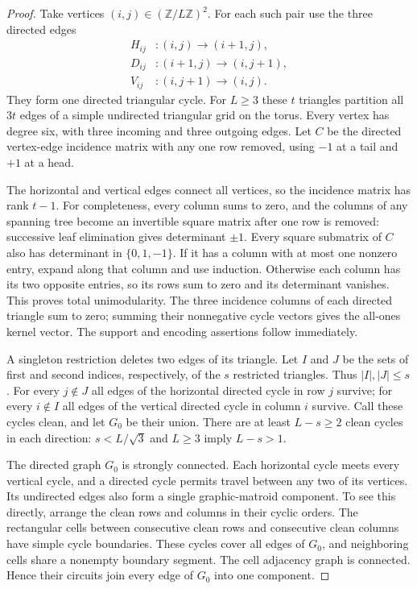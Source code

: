 \begin{proof}
Take vertices $(i,j)\in(\mathbb Z/L\mathbb Z)^2$.  For each such pair use the
three directed edges
\[
 \begin{split}
 H_{ij}&:(i,j)\longrightarrow(i+1,j),\\
 D_{ij}&:(i+1,j)\longrightarrow(i,j+1),\\
 V_{ij}&:(i,j+1)\longrightarrow(i,j).
 \end{split}
\]
They form one directed triangular cycle.  For $L\ge3$ these $t$ triangles
partition all $3t$ edges of a simple undirected triangular grid on the torus.
Every vertex has degree six, with three incoming and three outgoing edges.
Let $C$ be the directed vertex-edge incidence matrix with any one row removed,
using $-1$ at a tail and $+1$ at a head.

The horizontal and vertical edges connect all vertices, so the incidence
matrix has rank $t-1$.  For completeness, every column sums to zero, and
the columns of any spanning tree become an invertible square matrix after
one row is removed: successive leaf elimination gives determinant $\pm1$.
Every square submatrix of $C$ also has determinant in $\{0,1,-1\}$.
If it has a column with at most one nonzero entry, expand along that column
and use induction.  Otherwise each column has its two opposite entries,
so its rows sum to zero and its determinant vanishes.  This proves total
unimodularity.  The three incidence columns of each directed triangle sum
to zero; summing their nonnegative cycle vectors gives the all-ones kernel
vector.  The support and encoding assertions follow immediately.

A singleton restriction deletes two edges of its triangle.  Let $I$ and $J$
be the sets of first and second indices, respectively, of the $s$ restricted
triangles.  Thus $|I|,|J|\le s$.  For every $j\notin J$ all edges of the
horizontal directed cycle in row $j$ survive; for every $i\notin I$ all edges
of the vertical directed cycle in column $i$ survive.  Call these cycles
clean, and let $G_0$ be their union.  There are at least $L-s\ge2$ clean
cycles in each direction: $s<L/\sqrt3$ and $L\ge3$ imply $L-s>1$.

The directed graph $G_0$ is strongly connected.  Each horizontal cycle meets
every vertical cycle, and a directed cycle permits travel between any two
of its vertices.  Its undirected edges also form a single graphic-matroid
component.  To see this directly, arrange the clean rows and columns in
their cyclic orders.  The rectangular cells between consecutive clean rows
and consecutive clean columns have simple cycle boundaries.  These cycles
cover all edges of $G_0$, and neighboring cells share a nonempty boundary
segment.  The cell adjacency graph is connected.  Hence their circuits join
every edge of $G_0$ into one component.


\end{proof}
